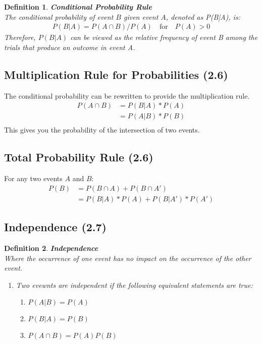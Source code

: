 \documentclass[../IND E 315.tex]{subfiles}
\newtheorem{defn}{Definition}
\begin{document}
\begin{defn}
    \textbf{Conditional Probability Rule} \\
    The conditional probability of event $B$ given event $A$, denoted as P(B|A), is: 
        \begin{equation*}
            \begin{aligned}
                P(B|A) = P(A \cap B) / P(A) \quad \text{for} \quad P(A) > 0 
            \end{aligned}
        \end{equation*}
    \emph{Therefore}, $P(B|A)$ can be viewed as the relative frequency of event B among the trials that produce an outcome in event A. 
\end{defn}

\subsection*{Multiplication Rule for Probabilities (2.6)}
The conditional probability can be rewritten to provide the multiplication rule.
    \begin{equation*}
        \begin{aligned}
            P(A \cap B) &= P(B|A) * P(A) \\
                    &= P(A|B) * P(B) \\
        \end{aligned}
    \end{equation*} 
This gives you the probability of the intersection of two events.

\subsection*{Total Probability Rule (2.6)}
For any two events $A$ and $B$:
    \begin{equation*}
        \begin{aligned}
            P(B) &= P(B \cap A) + P(B \cap A') \\
                &= P(B|A) * P(A) + P(B|A') * P(A')
        \end{aligned}
    \end{equation*} 

\subsection*{Independence (2.7)}
\begin{defn}
    \textbf{Independence} \\
    Where the occurrence of one event has no impact on the occurrence of the other event.
    \begin{enumerate}
        \item Two evewnts are independent if the following equivalent statements are true:
            \begin{enumerate}
                \item $P(A|B) = P(A)$
                \item $P(B|A) = P(B)$
                \item $P(A \cap B) = P(A)P(B)$
            \end{enumerate}
    \end{enumerate}
\end{defn}
\end{document}
